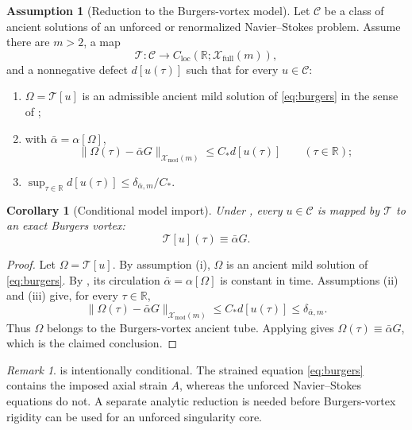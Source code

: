 \documentclass[11pt]{amsart}
\theoremstyle{plain}
\newtheorem{corollary}[theorem]{Corollary}
\theoremstyle{definition}
\newtheorem{assumption}[theorem]{Assumption}
\theoremstyle{remark}
\newtheorem{remark}[theorem]{Remark}
\numberwithin{equation}{section}
\begin{document}
\begin{assumption}[Reduction to the Burgers-vortex model]\label{ass:bv-reduction}
Let \(\mathcal C\) be a class of ancient solutions of an unforced or
renormalized Navier--Stokes problem.  Assume there are \(m>2\), a map
\[
   \mathcal T:\mathcal C\to
   C_{\mathrm{loc}}(\mathbb R;\mathcal X_{\mathrm{full}}(m)),
\]
and a nonnegative defect \(d[u(\tau)]\) such that for every \(u\in\mathcal C\):
\begin{enumerate}[label=\textup{(\roman*)}]
\item \(\Omega=\mathcal T[u]\) is an admissible ancient mild solution of
\eqref{eq:burgers} in the sense of ;
\item with \(\bar\alpha=\alpha[\Omega]\),
\[
   \|\Omega(\tau)-\bar\alpha G\|_{\mathcal X_{\mathrm{mod}}(m)}
   \le C_* d[u(\tau)]
   \qquad(\tau\in\mathbb R);
\]
\item \(\sup_{\tau\in\mathbb R}d[u(\tau)]\le
\delta_{\bar\alpha,m}/C_*\).
\end{enumerate}
\end{assumption}

\begin{corollary}[Conditional model import]\label{cor:bv-import}
Under , every \(u\in\mathcal C\) is mapped by
\(\mathcal T\) to an exact Burgers vortex:
\[
   \mathcal T[u](\tau)\equiv\bar\alpha G .
\]
\end{corollary}

\begin{proof}
Let \(\Omega=\mathcal T[u]\).  By assumption (i), \(\Omega\) is an ancient mild
solution of \eqref{eq:burgers}.  By , its
circulation \(\bar\alpha=\alpha[\Omega]\) is constant in time.  Assumptions
(ii) and (iii) give, for every \(\tau\in\mathbb R\),
\[
   \|\Omega(\tau)-\bar\alpha G\|_{\mathcal X_{\mathrm{mod}}(m)}
   \le
   C_* d[u(\tau)]
   \le
   \delta_{\bar\alpha,m}.
\]
Thus \(\Omega\) belongs to the Burgers-vortex ancient tube.  Applying
 gives \(\Omega(\tau)\equiv\bar\alpha G\), which is the
claimed conclusion.
\end{proof}

\begin{remark}
 is intentionally conditional.  The strained equation
\eqref{eq:burgers} contains the imposed axial strain \(A\), whereas the
unforced Navier--Stokes equations do not.  A separate analytic reduction is
needed before Burgers-vortex rigidity can be used for an unforced singularity
core.
\end{remark}
\end{document}
